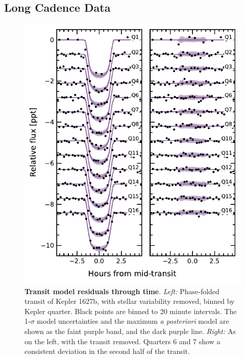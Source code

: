 \documentclass[12pt,modern,twocolumn,tighten]{aastex63}
\begin{document}
\subsection{Long Cadence Data}
\begin{figure}[t]
	\begin{center}
		\leavevmode
		\includegraphics[width=1\textwidth]{f9.pdf}
	\end{center}
	\vspace{-0.7cm}
	\caption{
		{\bf Transit model residuals through time}.  
    {\it Left:}
		Phase-folded transit of Kepler 1627b, with stellar
    variability removed, binned by Kepler quarter.
    Black points are binned to 20 minute intervals.
    The 1-$\sigma$ model uncertainties and the maximum {\it a
    posteriori} model are shown as the faint purple band, and the dark
    purple line.
    {\it Right:}
    As on the left, with the transit removed.
    Quarters 6 and 7 show a consistent deviation in the second half of
    the transit.
		\label{fig:phasequarter}
	}
\end{figure}
\end{document}
